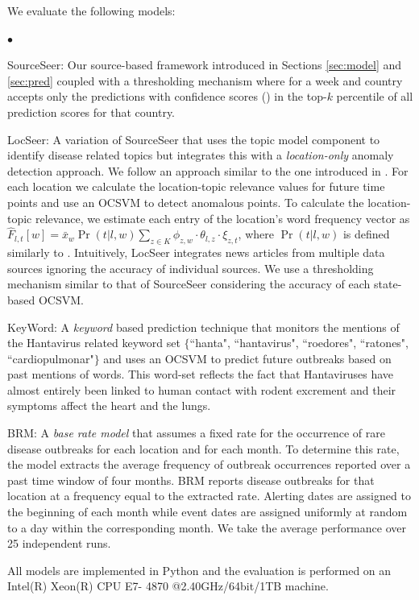 \documentclass[twoside,leqno,twocolumn]{article}
\newcommand{\squishlist}{
   \begin{list}{$\bullet$}
    {
      \setlength{\itemsep}{0pt}
      \setlength{\parsep}{3pt}
      \setlength{\topsep}{3pt}
      \setlength{\partopsep}{0pt}
      \setlength{\leftmargin}{1.5em}
      \setlength{\labelwidth}{1em}
      \setlength{\labelsep}{0.5em} } }
\newcommand{\squishend}{
    \end{list}  }
\newcommand{\fullmodel}{{{\sf SourceSeer}}\xspace}
\newcommand{\locationmodel}{{\sf LocSeer}\xspace}
\newcommand{\keymodel}{{\sf KeyWord}\xspace}
\begin{document}
 We evaluate the following models:
\squishlist
\item \fullmodel: Our source-based framework introduced in Sections \ref{sec:model} and \ref{sec:pred} coupled with a thresholding mechanism where for a week and country accepts only the predictions with confidence scores () in the top-$k$ percentile of all prediction scores for that country.
\item \locationmodel: A variation of \fullmodel that uses the topic model component to identify disease related topics but integrates this with a {\em location-only} anomaly detection approach. We follow an approach similar to the one introduced in . For each location we calculate the location-topic relevance values for future time points and use an OCSVM  to detect anomalous points. To calculate the location-topic relevance, we estimate each entry of the location's word frequency vector as $\hat{F}_{l,t}[w] = \bar{x}_{w} \Pr(t|l,w) \sum_{z \in K}\phi_{z,w}\cdot \theta_{l,z} \cdot \xi_{z,t}$, where $\Pr(t|l,w)$ is defined similarly to . Intuitively,  \locationmodel integrates news articles from multiple data sources ignoring the accuracy of individual sources. We use a thresholding mechanism similar to that of \fullmodel considering the accuracy of each state-based OCSVM. 
\item \keymodel: A {\em keyword} based prediction technique that monitors the mentions of the Hantavirus related keyword set $\{$``hanta", ``hantavirus", ``roedores", ``ratones", ``cardiopulmonar"$\}$ and uses an OCSVM to predict future outbreaks based on past mentions of words. This word-set reflects the fact that Hantaviruses have almost entirely been linked to human contact with rodent excrement and their symptoms affect the heart and the lungs.
\item BRM: A {\em base rate model} that assumes a fixed rate for the occurrence of rare disease outbreaks for each location and for each
month. To determine this rate, the model extracts the average frequency of outbreak occurrences reported over a past time window of four months. BRM reports disease outbreaks for that location at a frequency equal to the extracted rate. Alerting dates are assigned to the beginning of each month while event dates are assigned uniformly at random to a day within the corresponding month. We take the average performance over 25 independent runs.
\squishend
All models are implemented in Python and the evaluation is performed on an Intel(R) Xeon(R) CPU E7- 4870 @2.40GHz/64bit/1TB machine. 
\end{document}
